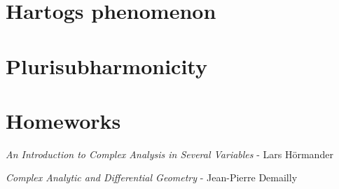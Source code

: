 \documentclass[a4paper,10pt]{article}
\begin{document}
\section{Hartogs phenomenon}

\newpage

\section{Plurisubharmonicity}

\newpage

\section{Homeworks}

\newpage

\begin{thebibliography}{}

\textit{An Introduction to Complex Analysis in Several Variables} - Lars H\"ormander

\textit{Complex Analytic and Differential Geometry} - Jean-Pierre Demailly

\end{thebibliography}

\printindex
\newpage
\end{document}
